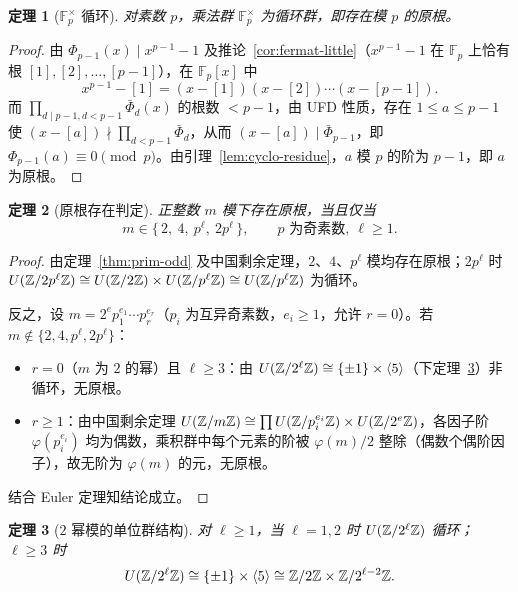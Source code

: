 \documentclass{article}
\theoremstyle{plain}
\newtheorem{thm}{定理}[section]
\theoremstyle{definition}
\theoremstyle{remark}
\begin{document}
\begin{thm}[$\mathbb{F}_p^\times$ 循环]\label{thm:prim-exist-p}
  对素数 $p$，乘法群 $\mathbb{F}_p^\times$ 为循环群，即存在模 $p$ 的原根。
\end{thm}

\begin{proof}
  由 $\Phi_{p-1}(x)\mid x^{p-1}-1$ 及推论~\ref{cor:fermat-little}（$x^{p-1}-1$ 在 $\mathbb{F}_p$ 上恰有根 $[1],[2],\dots,[p-1]$），在 $\mathbb{F}_p[x]$ 中
  \[
    x^{p-1}-[1]=(x-[1])(x-[2])\cdots(x-[p-1]).
  \]
  而 $\prod_{d\mid p-1,d<p-1}\bar\Phi_d(x)$ 的根数 $<p-1$，由 UFD 性质，存在 $1\le a\le p-1$ 使 $(x-[a])\nmid\prod_{d<p-1}\bar\Phi_d$，从而 $(x-[a])\mid\bar\Phi_{p-1}$，即 $\Phi_{p-1}(a)\equiv0\pmod p$。由引理~\ref{lem:cyclo-residue}，$a$ 模 $p$ 的阶为 $p-1$，即 $a$ 为原根。
\end{proof}

\begin{thm}[原根存在判定]\label{thm:prim-root-char}
  正整数 $m$ 模下存在原根，当且仅当
  \[
    m\in\{\,2,\ 4,\ p^\ell,\ 2p^\ell\,\},\qquad p\text{ 为奇素数},\ \ell\ge1.
  \]
\end{thm}

\begin{proof}
  由定理~\ref{thm:prim-odd} 及中国剩余定理，$2$、$4$、$p^\ell$ 模均存在原根；$2p^\ell$ 时 $U(\mathbb{Z}/2p^\ell\mathbb{Z})\cong U(\mathbb{Z}/2\mathbb{Z})\times U(\mathbb{Z}/p^\ell\mathbb{Z})\cong U(\mathbb{Z}/p^\ell\mathbb{Z})$ 为循环。

  反之，设 $m=2^e p_1^{e_1}\cdots p_r^{e_r}$（$p_i$ 为互异奇素数，$e_i\ge1$，允许 $r=0$）。若 $m\notin\{2,4,p^\ell,2p^\ell\}$：
  \begin{itemize}
    \item $r=0$（$m$ 为 $2$ 的幂）且 $\ell\ge3$：由 $U(\mathbb{Z}/2^\ell\mathbb{Z})\cong\{\pm1\}\times\langle5\rangle$（下定理~\ref{thm:prim-2pow}）非循环，无原根。
    \item $r\ge1$：由中国剩余定理 $U(\mathbb{Z}/m\mathbb{Z})\cong\prod U(\mathbb{Z}/p_i^{e_i}\mathbb{Z})\times U(\mathbb{Z}/2^e\mathbb{Z})$，各因子阶 $\varphi(p_i^{e_i})$ 均为偶数，乘积群中每个元素的阶被 $\varphi(m)/2$ 整除（偶数个偶阶因子），故无阶为 $\varphi(m)$ 的元，无原根。
  \end{itemize}
  结合 Euler 定理知结论成立。
\end{proof}

\begin{thm}[$2$ 幂模的单位群结构]\label{thm:prim-2pow}
  对 $\ell\ge1$，当 $\ell=1,2$ 时 $U(\mathbb{Z}/2^\ell\mathbb{Z})$ 循环；$\ell\ge3$ 时
  \[
    U(\mathbb{Z}/2^\ell\mathbb{Z})\cong\{\pm1\}\times\langle5\rangle\cong\mathbb{Z}/2\mathbb{Z}\times\mathbb{Z}/2^{\ell-2}\mathbb{Z}.
  \]
\end{thm}
\end{document}
